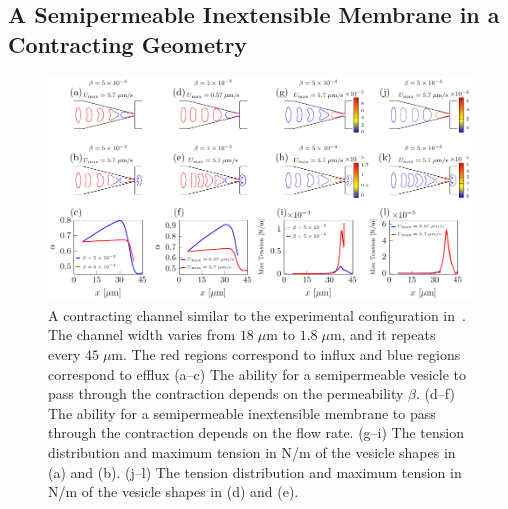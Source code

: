 \documentclass[prb,preprint,showpacs,preprintnumbers,amsmath,amssymb,longbibliography]{revtex4-1}
\newif\ifTikz
\begin{document}

\subsection{A Semipermeable Inextensible Membrane in a Contracting Geometry} 
\begin{figure}[htp]
  \centering
    \centering
  \ifTikz
  
  \else
  \includegraphics{figures/contractingComposite.pdf}
  \fi
  \caption{\label{fig:contractingComposite} A contracting channel
  similar to the experimental configuration in~\citet{wu2015critical}.
  The channel width varies from $18\;\mu$m to $1.8\;\mu$m, and it
  repeats every $45\;\mu$m. The red regions correspond to influx and
  blue regions correspond to efflux (a--c) The ability for a
  semipermeable vesicle to pass through the contraction depends on the
  permeability $\beta$. (d--f) The ability for a semipermeable
  inextensible membrane to pass through the contraction depends on the
  flow rate. (g--i) The tension distribution and maximum tension in N/m
  of the vesicle shapes in (a) and (b).  (j--l) The tension distribution
  and maximum tension in N/m of the vesicle shapes in (d) and (e).}
\end{figure}
\end{document}
